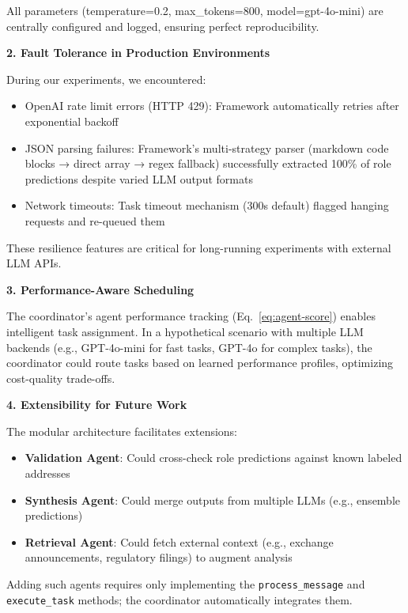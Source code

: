 All parameters (temperature=0.2, max\_tokens=800, model=gpt-4o-mini) are centrally configured and logged, ensuring perfect reproducibility.

\textbf{2. Fault Tolerance in Production Environments}

During our experiments, we encountered:
\begin{itemize}
    \item OpenAI rate limit errors (HTTP 429): Framework automatically retries after exponential backoff
    \item JSON parsing failures: Framework's multi-strategy parser (markdown code blocks → direct array → regex fallback) successfully extracted 100\% of role predictions despite varied LLM output formats
    \item Network timeouts: Task timeout mechanism (300s default) flagged hanging requests and re-queued them
\end{itemize}

These resilience features are critical for long-running experiments with external LLM APIs.

\textbf{3. Performance-Aware Scheduling}

The coordinator's agent performance tracking (Eq.~\ref{eq:agent-score}) enables intelligent task assignment. In a hypothetical scenario with multiple LLM backends (e.g., GPT-4o-mini for fast tasks, GPT-4o for complex tasks), the coordinator could route tasks based on learned performance profiles, optimizing cost-quality trade-offs.

\textbf{4. Extensibility for Future Work}

The modular architecture facilitates extensions:
\begin{itemize}
    \item \textbf{Validation Agent}: Could cross-check role predictions against known labeled addresses
    \item \textbf{Synthesis Agent}: Could merge outputs from multiple LLMs (e.g., ensemble predictions)
    \item \textbf{Retrieval Agent}: Could fetch external context (e.g., exchange announcements, regulatory filings) to augment analysis
\end{itemize}

Adding such agents requires only implementing the \texttt{process\_message} and \texttt{execute\_task} methods; the coordinator automatically integrates them.


